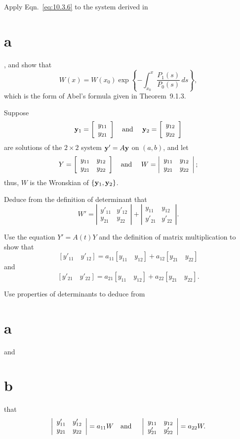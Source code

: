 \begin{exerciselist}
\begin{alist}
    \item %
    Apply Eqn.~\eqref{eq:10.3.6} to the system derived in \part{a}, and show that
    \[
      W(x)=W(x_{0})\exp\left\{-\int^{x}_{x_{0}}\frac{P_{1}(s)}{P_{0}(s)}\, ds\right\},
    \]
    which is the form of Abel's formula given in Theorem~9.1.3.
  \end{alist}

  \item\label{exer:10.3.4} Suppose
  \[
    {\bf y}_{1}=\left[\begin{array}{l}y_{11}\\y_{21}\end{array}\right]\mbox{\quad and \quad}{\bf y}_{2}=\left[\begin{array}{l}y_{12}\\y_{22}\end{array}\right]
  \]
  are solutions of the $2\times2$ system ${\bf y}'=A{\bf y}$ on $(a,b)$, and let
  \[
    Y=\left[\begin{array}{rr} y_{11}&y_{12}\\y_{21}&y_{22}\end{array}\right]\mbox{\quad and \quad}W=\left|
    \begin{array}{cc}
      y_{11} & y_{12} \\
      y_{21} & y_{22}
    \end{array}\right|;
  \]
  thus, $W$ is the Wronskian of $\{{\bf y}_{1},{\bf y}_{2}\}$.
  \begin{alist}
    \item %
    Deduce from the definition of determinant that
    \[
      W'=\left|
      \begin{array}{cc}
        {y'_{11}} & {y'_{12}} \\
        {y_{21}}  & {y_{22}}
      \end{array}\right| +\left|
      \begin{array}{cc}
        {y_{11}}  & {y_{12}}  \\
        {y'_{21}} & {y'_{22}}
      \end{array}\right|.
    \]

    \item %
    Use the equation $Y'=A(t)Y$ and the definition of matrix multiplication to show that
    \[
      [y'_{11}\quad y'_{12}]=a_{11}[y_{11}\quad y_{12}]+a_{12}[y_{21}\quad y_{22}]
    \]
    and
    \[
      [y'_{21}\quad y'_{22}]=a_{21}[y_{11}\quad y_{12}]+a_{22}[y_{21}\quad y_{22}].
    \]

    \item %
    Use properties of determinants to deduce from \part{a} and \part{b} that
    \[
      \left|
      \begin{array}{cc}
        {y'_{11}} & {y'_{12}} \\
        {y_{21}}  & {y_{22}}
      \end{array}\right|=a_{11}W\mbox{\quad and \quad}\left|
      \begin{array}{cc}
        {y_{11}}  & {y_{12}}  \\
        {y'_{21}} & {y'_{22}}
      \end{array}\right|=a_{22}W.
    \]


\end{alist}
\end{exerciselist}
